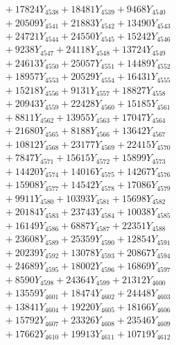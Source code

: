 \documentclass[a4paper,10pt]{article}
\begin{document}
{\begin{align}
&\;  + 17824 Y_{4538} + 18481 Y_{4539} + 9468 Y_{4540} \\[0.3ex]
&\;  + 20509 Y_{4541} + 21883 Y_{4542} + 13490 Y_{4543} \\[0.3ex]
&\;  + 24721 Y_{4544} + 24550 Y_{4545} + 15242 Y_{4546} \\[0.3ex]
&\;  + 9238 Y_{4547} + 24118 Y_{4548} + 13724 Y_{4549} \\[0.3ex]
&\;  + 24613 Y_{4550} + 25057 Y_{4551} + 14489 Y_{4552} \\[0.3ex]
&\;  + 18957 Y_{4553} + 20529 Y_{4554} + 16431 Y_{4555} \\[0.3ex]
&\;  + 15218 Y_{4556} + 9131 Y_{4557} + 18827 Y_{4558} \\[0.5ex]\allowbreak
&\;  + 20943 Y_{4559} + 22428 Y_{4560} + 15185 Y_{4561} \\[0.3ex]
&\;  + 8811 Y_{4562} + 13955 Y_{4563} + 17047 Y_{4564} \\[0.3ex]
&\;  + 21680 Y_{4565} + 8188 Y_{4566} + 13642 Y_{4567} \\[0.3ex]
&\;  + 10812 Y_{4568} + 23177 Y_{4569} + 22415 Y_{4570} \\[0.3ex]
&\;  + 7847 Y_{4571} + 15615 Y_{4572} + 15899 Y_{4573} \\[0.3ex]
&\;  + 14420 Y_{4574} + 14016 Y_{4575} + 14267 Y_{4576} \\[0.3ex]
&\;  + 15908 Y_{4577} + 14542 Y_{4578} + 17086 Y_{4579} \\[0.3ex]
&\;  + 9911 Y_{4580} + 10393 Y_{4581} + 15698 Y_{4582} \\[0.3ex]
&\;  + 20184 Y_{4583} + 23743 Y_{4584} + 10038 Y_{4585} \\[0.3ex]
&\;  + 16149 Y_{4586} + 6887 Y_{4587} + 22351 Y_{4588} \\[0.5ex]\allowbreak
&\;  + 23608 Y_{4589} + 25359 Y_{4590} + 12854 Y_{4591} \\[0.3ex]
&\;  + 20239 Y_{4592} + 13078 Y_{4593} + 20867 Y_{4594} \\[0.3ex]
&\;  + 24689 Y_{4595} + 18002 Y_{4596} + 16869 Y_{4597} \\[0.3ex]
&\;  + 8590 Y_{4598} + 24364 Y_{4599} + 21312 Y_{4600} \\[0.3ex]
&\;  + 13559 Y_{4601} + 18474 Y_{4602} + 24448 Y_{4603} \\[0.3ex]
&\;  + 13841 Y_{4604} + 19220 Y_{4605} + 18166 Y_{4606} \\[0.3ex]
&\;  + 15792 Y_{4607} + 23326 Y_{4608} + 23546 Y_{4609} \\[0.3ex]
&\;  + 17662 Y_{4610} + 19913 Y_{4611} + 10719 Y_{4612} \\[0.3ex]

\end{align}}
\end{document}
